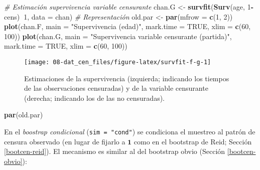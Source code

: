 \documentclass[]{book}
\newenvironment{Shaded}{\begin{snugshade}}{\end{snugshade}}
\newcommand{\KeywordTok}[1]{\textcolor[rgb]{0.13,0.29,0.53}{\textbf{#1}}}
\newcommand{\DataTypeTok}[1]{\textcolor[rgb]{0.13,0.29,0.53}{#1}}
\newcommand{\DecValTok}[1]{\textcolor[rgb]{0.00,0.00,0.81}{#1}}
\newcommand{\StringTok}[1]{\textcolor[rgb]{0.31,0.60,0.02}{#1}}
\newcommand{\CommentTok}[1]{\textcolor[rgb]{0.56,0.35,0.01}{\textit{#1}}}
\newcommand{\OtherTok}[1]{\textcolor[rgb]{0.56,0.35,0.01}{#1}}
\newcommand{\OperatorTok}[1]{\textcolor[rgb]{0.81,0.36,0.00}{\textbf{#1}}}
\newcommand{\NormalTok}[1]{#1}
\theoremstyle{break}
\theoremstyle{definition}
\theoremstyle{definition}
\theoremstyle{definition}
\theoremstyle{remark}
\begin{document}
\begin{Shaded}
\begin{Highlighting}[]
\CommentTok{# Estimación supervivencia variable censurante}
\NormalTok{chan.G <-}\StringTok{ }\KeywordTok{survfit}\NormalTok{(}\KeywordTok{Surv}\NormalTok{(age, }\DecValTok{1}\OperatorTok{-}\NormalTok{cens)}\OperatorTok{~}\DecValTok{1}\NormalTok{, }\DataTypeTok{data =}\NormalTok{ chan)}
\CommentTok{# Representación}
\NormalTok{old.par <-}\StringTok{ }\KeywordTok{par}\NormalTok{(}\DataTypeTok{mfrow =} \KeywordTok{c}\NormalTok{(}\DecValTok{1}\NormalTok{, }\DecValTok{2}\NormalTok{))}
\KeywordTok{plot}\NormalTok{(chan.F, }\DataTypeTok{main =} \StringTok{"Supervivencia (edad)"}\NormalTok{, }\DataTypeTok{mark.time =} \OtherTok{TRUE}\NormalTok{, }
    \DataTypeTok{xlim =} \KeywordTok{c}\NormalTok{(}\DecValTok{60}\NormalTok{, }\DecValTok{100}\NormalTok{))}
\KeywordTok{plot}\NormalTok{(chan.G, }\DataTypeTok{main =} \StringTok{"Supervivencia variable censurante (partida)"}\NormalTok{, }
     \DataTypeTok{mark.time =} \OtherTok{TRUE}\NormalTok{, }\DataTypeTok{xlim =} \KeywordTok{c}\NormalTok{(}\DecValTok{60}\NormalTok{, }\DecValTok{100}\NormalTok{))}
\end{Highlighting}
\end{Shaded}

\begin{figure}[!htb]

{\centering \texttt{[image: 08-dat\_cen\_files/figure-latex/survfit-f-g-1]} 

}

\caption{Estimaciones de la supervivencia (izquierda; indicando los tiempos de las observaciones censuradas) y de la variable censurante (derecha; indicando los de las no censuradas).}\label{fig:survfit-f-g}
\end{figure}

\begin{Shaded}
\begin{Highlighting}[]
\KeywordTok{par}\NormalTok{(old.par)}
\end{Highlighting}
\end{Shaded}

En el \emph{boostrap condicional} (\texttt{sim\ =\ "cond"}) se
condiciona el muestreo al patrón de censura observado (en lugar de
fijarlo a \(\mathbf{1}\) como en el bootstrap de Reid; Sección
\ref{bootcen-reid}). El mecanismo es similar al del bootstrap obvio
(Sección \ref{bootcen-obvio}):
\end{document}
